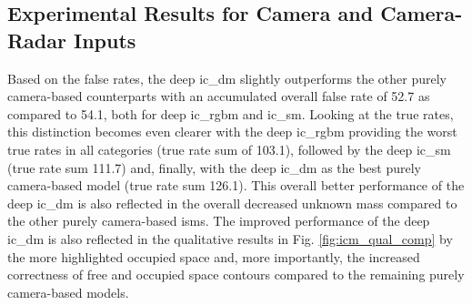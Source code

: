 \subsection{Experimental Results for Camera and Camera-Radar Inputs}
\label{subsec:exp_cam_fusion_in_deep_isms}
Based on the false rates, the deep \gls{ic_dm} slightly outperforms the other purely camera-based counterparts with an accumulated overall false rate of 52.7 as compared to 54.1, both for deep \gls{ic_rgbm} and \gls{ic_sm}. Looking at the true rates, this distinction becomes even clearer with the deep \gls{ic_rgbm} providing the worst true rates in all categories (true rate sum of 103.1), followed by the deep \gls{ic_sm} (true rate sum 111.7) and, finally, with the deep \gls{ic_dm} as the best purely camera-based model (true rate sum 126.1). This overall better performance of the deep \gls{ic_dm} is also reflected in the overall decreased unknown mass compared to the other purely camera-based \gls{ism}s. The improved performance of the deep \gls{ic_dm} is also reflected in the qualitative results in Fig. \ref{fig:icm_qual_comp} by the more highlighted occupied space and, more importantly, the increased correctness of free and occupied space contours compared to the remaining purely camera-based models.
